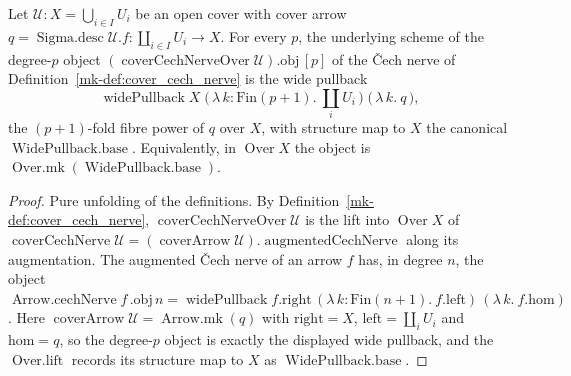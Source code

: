 \begin{lemma}\label{mk-lem:cechBackbone_obj_widePullback}
  \leanok

  Let \(\mathcal{U} : X = \bigcup_{i \in I} U_i\) be an open cover with cover arrow
  \(q = \operatorname{Sigma.desc}\mathcal{U}.f : \coprod_{i \in I} U_i \to X\). For every
  \(p\), the underlying scheme of the degree-\(p\) object
  \((\operatorname{coverCechNerveOver}\mathcal{U}).\mathrm{obj}\,[p]\) of the {\v C}ech nerve of
  Definition~\ref{mk-def:cover_cech_nerve} is the wide pullback
  \[
    \operatorname{widePullback} X \;\bigl(\,\lambda\,k : \mathrm{Fin}(p+1).\ \textstyle\coprod_{i} U_i\,\bigr)
      \;\bigl(\,\lambda\,k.\ q\,\bigr),
  \]
  the \((p+1)\)-fold fibre power of \(q\) over \(X\), with structure map to \(X\) the canonical
  \(\operatorname{WidePullback.base}\). Equivalently, in \(\operatorname{Over} X\) the object is
  \(\operatorname{Over.mk}(\operatorname{WidePullback.base})\).
\end{lemma}
\begin{proof}
  Pure unfolding of the definitions. By Definition~\ref{mk-def:cover_cech_nerve},
  \(\operatorname{coverCechNerveOver}\mathcal{U}\) is the lift into \(\operatorname{Over} X\) of
  \(\operatorname{coverCechNerve}\mathcal{U} = (\operatorname{coverArrow}\mathcal{U}).
  \operatorname{augmentedCechNerve}\) along its augmentation. The augmented {\v C}ech nerve of an
  arrow \(f\) has, in degree \(n\), the object \(\operatorname{Arrow.cechNerve} f\,.\mathrm{obj}\,
  n = \operatorname{widePullback} f.\mathrm{right}\,(\lambda\,k : \mathrm{Fin}(n+1).\ f.\mathrm{left})
  \,(\lambda\,k.\ f.\mathrm{hom})\). Here \(\operatorname{coverArrow}\mathcal{U} =
  \operatorname{Arrow.mk}(q)\) with \(\mathrm{right} = X\), \(\mathrm{left} = \coprod_i U_i\) and
  \(\mathrm{hom} = q\), so the degree-\(p\) object is exactly the displayed wide pullback, and the
  \(\operatorname{Over.lift}\) records its structure map to \(X\) as
  \(\operatorname{WidePullback.base}\).
\end{proof}

